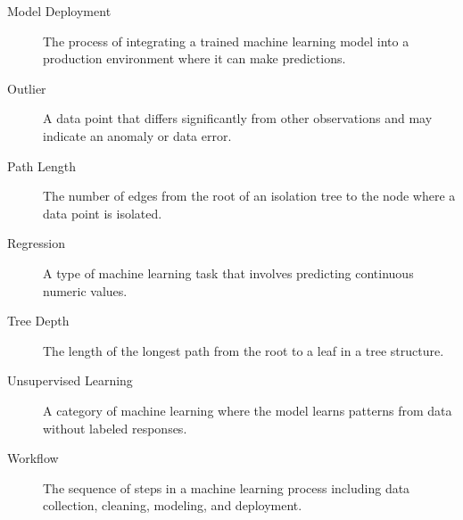 \documentclass[11pt]{article}
\begin{document}
\begin{description}
\item[{Model Deployment}] The process of integrating a trained machine learning model into a production environment where it can make predictions.
\item[{Outlier}] A data point that differs significantly from other observations and may indicate an anomaly or data error.
\item[{Path Length}] The number of edges from the root of an isolation tree to the node where a data point is isolated.
\item[{Regression}] A type of machine learning task that involves predicting continuous numeric values.
\item[{Tree Depth}] The length of the longest path from the root to a leaf in a tree structure.
\item[{Unsupervised Learning}] A category of machine learning where the model learns patterns from data without labeled responses.
\item[{Workflow}] The sequence of steps in a machine learning process including data collection, cleaning, modeling, and deployment.
\end{description}
\end{document}
